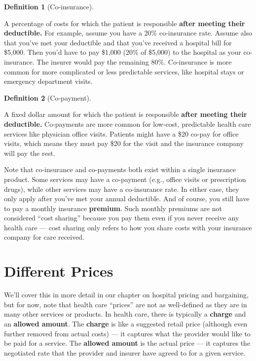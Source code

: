 \documentclass[
  letterpaper,
  DIV=11,
  numbers=noendperiod]{scrreport}
\theoremstyle{definition}
\newtheorem{definition}{Definition}[chapter]
\theoremstyle{remark}
\begin{document}
\begin{definition}[Co-insurance]\protect\hypertarget{def-coinsurance}{}\label{def-coinsurance}

A percentage of costs for which the patient is responsible \textbf{after
meeting their deductible.} For example, assume you have a 20\%
co-insurance rate. Assume also that you've met your deductible and that
you've received a hospital bill for \$5,000. Then you'd have to pay
\$1,000 (20\% of \$5,000) to the hospital as your co-insurance. The
insurer would pay the remaining 80\%. Co-insurance is more common for
more complicated or less predictable services, like hospital stays or
emergency department visits.

\end{definition}

\begin{definition}[Co-payment]\protect\hypertarget{def-copayment}{}\label{def-copayment}

A fixed dollar amount for which the patient is responsible \textbf{after
meeting their deductible.} Co-payments are more common for low-cost,
predictable health care services like physician office visits. Patients
might have a \$20 co-pay for office visits, which means they must pay
\$20 for the visit and the insurance company will pay the rest.

\end{definition}

Note that co-insurance and co-payments both exist within a single
insurance product. Some services may have a co-payment (e.g., office
visits or prescription drugs), while other services may have a
co-insurance rate. In either case, they only apply after you've met your
annual deductible. And of course, you still have to pay a monthly
insurance \textbf{premium}. Such monthly premiums are not considered
``cost sharing'' because you pay them even if you never receive any
health care --- cost sharing only refers to how you share costs with
your insurance company for care received.

\hypertarget{sec-prices1}{%
\section{Different Prices}\label{sec-prices1}}

We'll cover this in more detail in our chapter on hospital pricing and
bargaining, but for now, note that health care ``prices'' are not as
well-defined as they are in many other services or products. In health
care, there is typically a \textbf{charge} and an \textbf{allowed
amount}. The \textbf{charge} is like a suggested retail price (although
even further removed from actual costs) --- it captures what the
provider would like to be paid for a service. The \textbf{allowed
amount} is the actual price --- it captures the negotiated rate that the
provider and insurer have agreed to for a given service.
\end{document}
